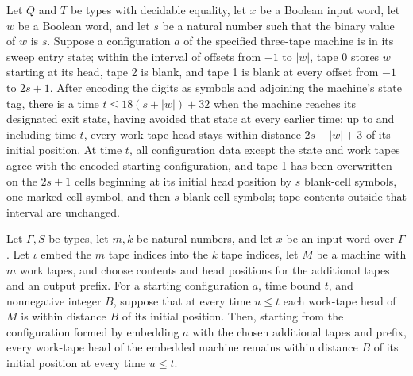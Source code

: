 \begin{theorem}
\label{Turing.rt_cellWindow_run}
\leanok
{}
Let $Q$ and $T$ be types with decidable equality, let $x$ be a Boolean input word, let
$w$ be a Boolean word, and let $s$ be a natural number such that the binary value of $w$
is $s$. Suppose a configuration $a$ of the specified three-tape machine is in its sweep
entry state; within the interval of offsets from $-1$ to $|w|$, tape 0 stores $w$
starting at its head, tape 2 is blank, and tape 1 is blank at every offset from $-1$ to
$2s+1$. After encoding the digits as symbols and adjoining the machine's state tag,
there is a time $t\le 18(s+|w|)+32$ when the machine reaches its designated exit state,
having avoided that state at every earlier time; up to and including time $t$, every
work-tape head stays within distance $2s+|w|+3$ of its initial position. At time $t$,
all configuration data except the state and work tapes agree with the encoded starting
configuration, and tape 1 has been overwritten on the $2s+1$ cells beginning at its
initial head position by $s$ blank-cell symbols, one marked cell symbol, and then $s$
blank-cell symbols; tape contents outside that interval are unchanged.
\end{theorem}

\begin{theorem}
\label{Turing.rt_embed_radius}
\leanok
{}
Let $\Gamma,S$ be types, let $m,k$ be natural numbers, and let $x$ be an input word over
$\Gamma$. Let $\iota$ embed the $m$ tape indices into the $k$ tape indices, let $M$ be a
machine with $m$ work tapes, and choose contents and head positions for the additional
tapes and an output prefix. For a starting configuration $a$, time bound $t$, and
nonnegative integer $B$, suppose that at every time $u\le t$ each work-tape head of $M$
is within distance $B$ of its initial position. Then, starting from the configuration
formed by embedding $a$ with the chosen additional tapes and prefix, every work-tape
head of the embedded machine remains within distance $B$ of its initial position at
every time $u\le t$.
\end{theorem}

